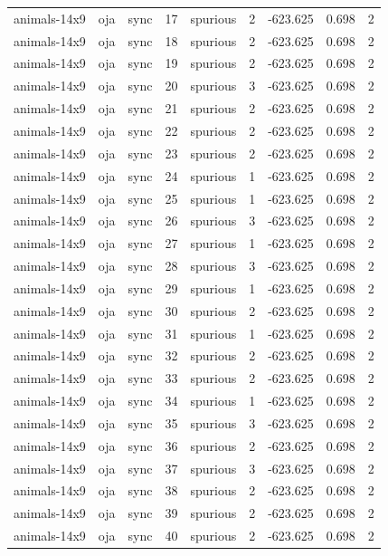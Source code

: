 \begin{tabular}{lllrlrrrr}
animals-14x9 & oja & sync & 17 & spurious & 2 & -623.625 & 0.698 & 2 \\
animals-14x9 & oja & sync & 18 & spurious & 2 & -623.625 & 0.698 & 2 \\
animals-14x9 & oja & sync & 19 & spurious & 2 & -623.625 & 0.698 & 2 \\
animals-14x9 & oja & sync & 20 & spurious & 3 & -623.625 & 0.698 & 2 \\
animals-14x9 & oja & sync & 21 & spurious & 2 & -623.625 & 0.698 & 2 \\
animals-14x9 & oja & sync & 22 & spurious & 2 & -623.625 & 0.698 & 2 \\
animals-14x9 & oja & sync & 23 & spurious & 2 & -623.625 & 0.698 & 2 \\
animals-14x9 & oja & sync & 24 & spurious & 1 & -623.625 & 0.698 & 2 \\
animals-14x9 & oja & sync & 25 & spurious & 1 & -623.625 & 0.698 & 2 \\
animals-14x9 & oja & sync & 26 & spurious & 3 & -623.625 & 0.698 & 2 \\
animals-14x9 & oja & sync & 27 & spurious & 1 & -623.625 & 0.698 & 2 \\
animals-14x9 & oja & sync & 28 & spurious & 3 & -623.625 & 0.698 & 2 \\
animals-14x9 & oja & sync & 29 & spurious & 1 & -623.625 & 0.698 & 2 \\
animals-14x9 & oja & sync & 30 & spurious & 2 & -623.625 & 0.698 & 2 \\
animals-14x9 & oja & sync & 31 & spurious & 1 & -623.625 & 0.698 & 2 \\
animals-14x9 & oja & sync & 32 & spurious & 2 & -623.625 & 0.698 & 2 \\
animals-14x9 & oja & sync & 33 & spurious & 2 & -623.625 & 0.698 & 2 \\
animals-14x9 & oja & sync & 34 & spurious & 1 & -623.625 & 0.698 & 2 \\
animals-14x9 & oja & sync & 35 & spurious & 3 & -623.625 & 0.698 & 2 \\
animals-14x9 & oja & sync & 36 & spurious & 2 & -623.625 & 0.698 & 2 \\
animals-14x9 & oja & sync & 37 & spurious & 3 & -623.625 & 0.698 & 2 \\
animals-14x9 & oja & sync & 38 & spurious & 2 & -623.625 & 0.698 & 2 \\
animals-14x9 & oja & sync & 39 & spurious & 2 & -623.625 & 0.698 & 2 \\
animals-14x9 & oja & sync & 40 & spurious & 2 & -623.625 & 0.698 & 2 \\

\end{tabular}
